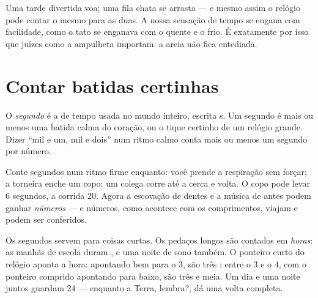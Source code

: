 \begin{remark}\label{rem:g2:measuring-time:feelings}
Uma tarde divertida voa; uma fila chata se arrasta --- e mesmo assim
o relógio pode contar o mesmo para as duas. A nossa sensação de tempo
se engana com facilidade, como o tato se enganava com o quente e o
frio. É exatamente por isso que juízes como a ampulheta importam: a
areia não fica entediada.
\end{remark}

\section{Contar batidas certinhas}

\begin{definition}[O segundo]\label{def:g2:measuring-time:second}
O \emph{segundo} é a  de tempo usada no mundo
inteiro, escrita \unit{s}. Um segundo é mais ou menos uma batida
calma do coração, ou o tique certinho de um relógio grande. Dizer
``mil e um, mil e dois'' num ritmo calmo conta mais ou menos um
segundo por número.
\end{definition}

\begin{example}\label{ex:g2:measuring-time:count}
Conte segundos num ritmo firme enquanto: você prende a respiração
sem forçar; a torneira enche um copo; um colega corre até a cerca e
volta. O copo pode levar $6$ segundos, a corrida $20$. Agora a
escovação de dentes e a música de antes podem ganhar \emph{números}
--- e números, como acontece com os comprimentos, viajam e podem ser
conferidos.
\end{example}

\begin{example}\label{ex:g2:measuring-time:clock}
Os segundos servem para coisas curtas. Os pedaços longos são contados
em \emph{horas}: as manhãs de escola duram , e uma
noite de sono também. O ponteiro curto do relógio aponta a hora:
apontando bem para o $3$, são três ; entre o $3$ e o $4$, com o
ponteiro comprido apontando para baixo, são três e meia. Um dia e uma
noite juntos guardam $24$  --- enquanto a Terra, lembra?, dá uma
volta completa.
\end{example}

